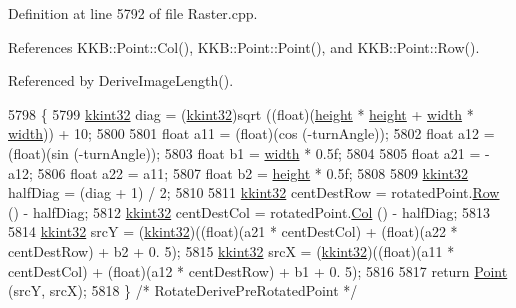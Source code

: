 Definition at line 5792 of file Raster.\+cpp.



References K\+K\+B\+::\+Point\+::\+Col(), K\+K\+B\+::\+Point\+::\+Point(), and K\+K\+B\+::\+Point\+::\+Row().



Referenced by Derive\+Image\+Length().


\begin{DoxyCode}
5798 \{
5799   \hyperlink{namespace_k_k_b_a8fa4952cc84fda1de4bec1fbdd8d5b1b}{kkint32}  diag = (\hyperlink{namespace_k_k_b_a8fa4952cc84fda1de4bec1fbdd8d5b1b}{kkint32})sqrt ((\textcolor{keywordtype}{float})(\hyperlink{class_k_k_b_1_1_raster_af39ff189de4fbb6de98392e187efafb7}{height} * \hyperlink{class_k_k_b_1_1_raster_af39ff189de4fbb6de98392e187efafb7}{height} + 
      \hyperlink{class_k_k_b_1_1_raster_ae0bcc103e191c3421d7692dc69ceb554}{width} * \hyperlink{class_k_k_b_1_1_raster_ae0bcc103e191c3421d7692dc69ceb554}{width})) + 10;
5800 
5801   \textcolor{keywordtype}{float}  a11 = (float)(cos (-turnAngle));
5802   \textcolor{keywordtype}{float}  a12 = (float)(sin (-turnAngle));
5803   \textcolor{keywordtype}{float}  b1  = \hyperlink{class_k_k_b_1_1_raster_ae0bcc103e191c3421d7692dc69ceb554}{width}  * 0.5f;
5804 
5805   \textcolor{keywordtype}{float}  a21 = -a12;
5806   \textcolor{keywordtype}{float}  a22 = a11;
5807   \textcolor{keywordtype}{float}  b2  = \hyperlink{class_k_k_b_1_1_raster_af39ff189de4fbb6de98392e187efafb7}{height} * 0.5f;
5808 
5809   \hyperlink{namespace_k_k_b_a8fa4952cc84fda1de4bec1fbdd8d5b1b}{kkint32}  halfDiag = (diag + 1) / 2;
5810 
5811   \hyperlink{namespace_k_k_b_a8fa4952cc84fda1de4bec1fbdd8d5b1b}{kkint32}  centDestRow = rotatedPoint.\hyperlink{class_k_k_b_1_1_point_abfc34bcf809fc9fb95baf5c745b07549}{Row} () - halfDiag;
5812   \hyperlink{namespace_k_k_b_a8fa4952cc84fda1de4bec1fbdd8d5b1b}{kkint32}  centDestCol = rotatedPoint.\hyperlink{class_k_k_b_1_1_point_afb196b03757fc697f6ade0129a1c7fcf}{Col} () - halfDiag;
5813 
5814   \hyperlink{namespace_k_k_b_a8fa4952cc84fda1de4bec1fbdd8d5b1b}{kkint32}  srcY = (\hyperlink{namespace_k_k_b_a8fa4952cc84fda1de4bec1fbdd8d5b1b}{kkint32})((\textcolor{keywordtype}{float})(a21 * centDestCol) + (\textcolor{keywordtype}{float})(a22 * centDestRow) + b2 + 0.
      5);
5815   \hyperlink{namespace_k_k_b_a8fa4952cc84fda1de4bec1fbdd8d5b1b}{kkint32}  srcX = (\hyperlink{namespace_k_k_b_a8fa4952cc84fda1de4bec1fbdd8d5b1b}{kkint32})((\textcolor{keywordtype}{float})(a11 * centDestCol) + (\textcolor{keywordtype}{float})(a12 * centDestRow) + b1 + 0.
      5);
5816 
5817   \textcolor{keywordflow}{return}  \hyperlink{class_k_k_b_1_1_point}{Point} (srcY, srcX);
5818 \}  \textcolor{comment}{/* RotateDerivePreRotatedPoint */}
\end{DoxyCode}
